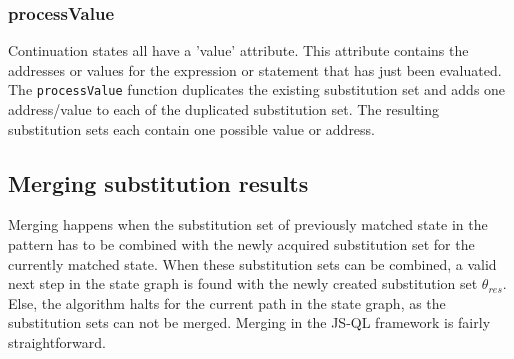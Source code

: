 \subsubsection{processValue}
Continuation states all have a 'value' attribute. This attribute contains the addresses or values for the expression or statement that has just been evaluated. The \texttt{processValue} function duplicates the existing substitution set and adds one address/value to each of the duplicated substitution set. The resulting substitution sets each contain one possible value or address.



\subsection{Merging substitution results}
\label{subsec:merging}

Merging happens when the substitution set of previously matched state in the pattern has to be combined with the newly acquired substitution set for the currently matched state. When these substitution sets can be combined, a valid next step in the state graph is found with the newly created substitution set $\theta_{res}$. Else, the algorithm halts for the current path in the state graph, as the substitution sets can not be merged. Merging in the JS-QL framework is fairly straightforward. 


